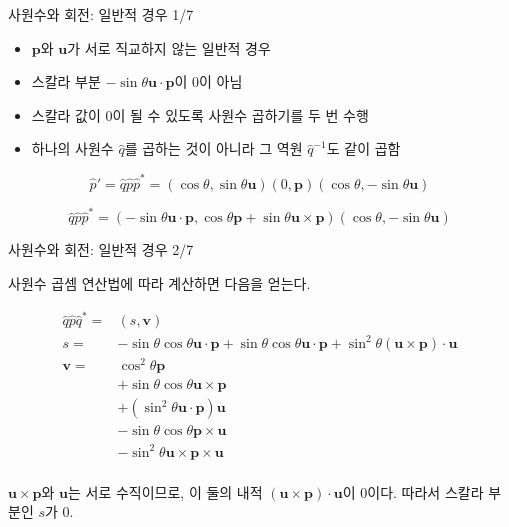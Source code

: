 \begin{frame}[fragile]{사원수와 회전: 일반적 경우 1/7}

\begin{itemize}
\item $\mathbf p$와 $\mathbf u$가 서로 직교하지 않는 일반적 경우
\item 스칼라 부분 $-\sin \theta \mathbf u \cdot \mathbf p$이 0이 아님
\item 스칼라 값이 0이 될 수 있도록 사원수 곱하기를 두 번 수행
\item 하나의 사원수 $\hat q$를 곱하는 것이 아니라 그 역원 $\hat q^{-1}$도 같이 곱함
\end{itemize}

$$\hat p' = \hat q \hat p \hat p^* = (\cos \theta, \sin \theta \mathbf u) (0, \mathbf p) (\cos \theta, - \sin \theta \mathbf u)$$

$$\hat q \hat p \hat p^* = (-\sin \theta \mathbf u \cdot \mathbf p , \cos \theta \mathbf p + \sin \theta \mathbf u \times \mathbf p)  (\cos \theta, - \sin \theta \mathbf u)$$

\end{frame}

\begin{frame}[fragile]{사원수와 회전: 일반적 경우 2/7}

{\small
사원수 곱셈 연산법에 따라 계산하면 다음을 얻는다.


\begin{eqnarray}\nonumber
\hat q \hat p \hat q^* =  &( s, \mathbf v) \\ \nonumber
s = & - \sin \theta \cos \theta \mathbf u \cdot \mathbf p + \sin \theta \cos \theta \mathbf u \cdot \mathbf p + \sin^2 \theta (\mathbf u \times \mathbf p ) \cdot \mathbf u \\ \nonumber
\mathbf v =  & \cos^2 \theta \mathbf p \\ \nonumber
& + \sin \theta \cos \theta \mathbf u \times \mathbf p \\ \nonumber
& + (\sin^2 \theta \mathbf u \cdot \mathbf p ) \mathbf u \\ \nonumber
& - \sin \theta \cos \theta \mathbf p \times \mathbf u \\ \nonumber
& - \sin^2 \theta \mathbf u \times \mathbf p \times \mathbf u \\ \nonumber
\end{eqnarray}


$\mathbf u \times \mathbf p$와 $\mathbf u$는 서로 수직이므로,
이 둘의 내적 $(\mathbf u \times \mathbf p ) \cdot \mathbf u$이 0이다.
따라서 스칼라 부분인 $s$가 0.
}

\end{frame}

